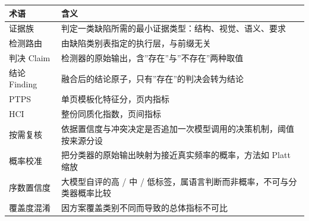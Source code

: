 \documentclass[
  11pt,
]{article}
\newcounter{none} %
\begin{document}
{\def\LTcaptype{none} %
\begin{longtable}[]{@{}
  >{\raggedright\arraybackslash}p{}
  >{\raggedright\arraybackslash}p{}@{}}
\toprule\noalign{}
\begin{minipage}[b]{\linewidth}\raggedright
术语
\end{minipage} & \begin{minipage}[b]{\linewidth}\raggedright
含义
\end{minipage} \\
\midrule\noalign{}
\endhead
\bottomrule\noalign{}
\endlastfoot
证据族 & 判定一类缺陷所需的最小证据类型：结构、视觉、语义、要求 \\
检测路由 & 由缺陷类别表指定的执行层，与前缀无关 \\
判决 Claim & 检测器的原始输出，含''存在''与''不存在''两种取值 \\
结论 Finding & 融合后的结论原子，只有''存在''的判决会转为结论 \\
PTPS & 单页模板化特征分，页内指标 \\
HCI & 整份同质化指数，页间指标 \\
按需复核 &
依据置信度与冲突决定是否追加一次模型调用的决策机制，阈值按来源分设 \\
概率校准 & 把分类器的原始输出映射为接近真实频率的概率，方法如 Platt
缩放 \\
序数置信度 & 大模型自评的高 / 中 /
低标签，属语言判断而非概率，不可与分类器概率比较 \\
覆盖度混淆 & 因方案覆盖类别不同而导致的总体指标不可比 \\
\end{longtable}
}
\end{document}
